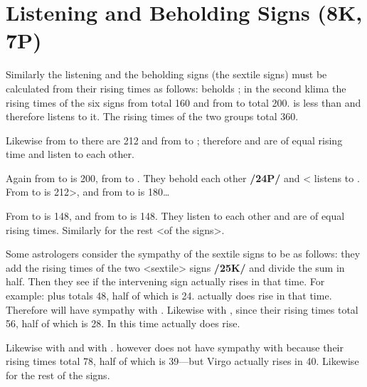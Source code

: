 \section{Listening and Beholding Signs (8K, 7P)}
Similarly the listening and the beholding signs (the sextile signs) must be calculated from their rising times as follows: \Pisces\xspace beholds \Taurus\xspace; in the second klima the rising times of the six signs from \Pisces\xspace <to Leo> total 160 and from \Taurus\xspace to \Libra\xspace total 200. \Pisces\xspace is less than \Taurus\xspace and therefore listens to it. The rising times of the two groups total 360. 

Likewise from \Gemini\xspace to \Scorpio\xspace there are 212 and from \Leo\xspace to \Capricorn\xspace 212; therefore \Gemini\xspace and \Leo\xspace are of equal rising time and listen to each other. 

Again from \Virgo\xspace to \Aquarius\xspace is 200, from \Scorpio\xspace to \Aries\xspace 160. They behold each other \textbf{/24P/} and <\Scorpio\xspace listens to \Virgo\xspace. From \Leo\xspace to \Capricorn\xspace is 212>, and from \Libra\xspace to \Pisces\xspace is 180\ldots 

From \Sagittarius\xspace to \Taurus\xspace is 148, and from \Aquarius\xspace to \Cancer\xspace is 148. They listen to each other and are of equal rising times. Similarly for the rest <of the signs>.

Some astrologers consider the sympathy of the sextile signs to be as follows: they add the rising times of the two <sextile> signs \textbf{/25K/} and divide the sum in half. Then they see if the intervening sign actually rises in that time. For example: \Aries\xspace 20 plus \Gemini\xspace 28 totals 48, half of which is 24. \Taurus\xspace actually does rise in that time. Therefore \Aries\xspace will have sympathy with \Gemini\xspace. Likewise \Taurus\xspace with \Cancer, since their rising times total 56, half of which is 28. In this time \Gemini\xspace actually does rise. 

Likewise \Gemini\xspace with \Leo\xspace and \Cancer\xspace with \Virgo. \Leo\xspace however does not have sympathy with \Libra\xspace because their rising times total 78, half of which is 39—but Virgo actually rises in 40. Likewise for the rest of the signs.

\newpage